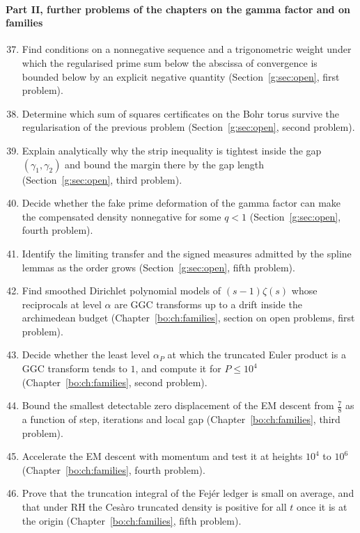 \paragraph{Part II, further problems of the chapters on the gamma factor and on families}
\begin{enumerate}
\setcounter{enumi}{36}
\item Find conditions on a nonnegative sequence and a trigonometric weight under which the regularised prime sum below the abscissa of convergence is bounded below by an explicit negative quantity (Section~\ref{g:sec:open}, first problem).
\item Determine which sum of squares certificates on the Bohr torus survive the regularisation of the previous problem (Section~\ref{g:sec:open}, second problem).
\item Explain analytically why the strip inequality is tightest inside the gap $(\gamma_1,\gamma_2)$ and bound the margin there by the gap length (Section~\ref{g:sec:open}, third problem).
\item Decide whether the fake prime deformation of the gamma factor can make the compensated density nonnegative for some $q<1$ (Section~\ref{g:sec:open}, fourth problem).
\item Identify the limiting transfer and the signed measures admitted by the spline lemmas as the order grows (Section~\ref{g:sec:open}, fifth problem).
\item Find smoothed Dirichlet polynomial models of $(s-1)\zeta(s)$ whose reciprocals at level $\alpha$ are GGC transforms up to a drift inside the archimedean budget (Chapter~\ref{bo:ch:families}, section on open problems, first problem).
\item Decide whether the least level $\alpha_P$ at which the truncated Euler product is a GGC transform tends to $1$, and compute it for $P\le10^4$ (Chapter~\ref{bo:ch:families}, second problem).
\item Bound the smallest detectable zero displacement of the EM descent from $\frac78$ as a function of step, iterations and local gap (Chapter~\ref{bo:ch:families}, third problem).
\item Accelerate the EM descent with momentum and test it at heights $10^4$ to $10^6$ (Chapter~\ref{bo:ch:families}, fourth problem).
\item Prove that the truncation integral of the Fej\'er ledger is small on average, and that under RH the Ces\`aro truncated density is positive for all $t$ once it is at the origin (Chapter~\ref{bo:ch:families}, fifth problem).

\end{enumerate}

